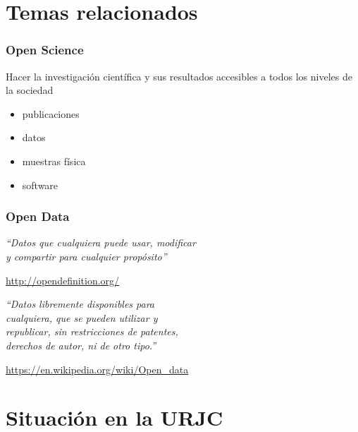 \documentclass[17pt,aspectratio=169]{beamer}
\begin{document}
\section{Temas relacionados}

\begin{frame}
\frametitle{Open Science}

Hacer la investigación científica y sus resultados accesibles a todos los niveles de la sociedad

\begin{itemize}
\item publicaciones
\item datos
\item muestras física
\item software
\end{itemize}

\end{frame}

\begin{frame}
\frametitle{Open Data}

{\em ``Datos que cualquiera puede usar, modificar \\
  y compartir para cualquier propósito'' \\
}
\begin{flushright}
  \url{http://opendefinition.org/}
\end{flushright}

{\em ``Datos libremente disponibles para \\
cualquiera, que se pueden utilizar y \\
republicar, sin restricciones de patentes, \\
derechos de autor, ni de otro tipo.'' \\
}

\begin{flushright}
  \url{https://en.wikipedia.org/wiki/Open_data}
\end{flushright}



\end{frame}

\section{Situación en la URJC}
\end{document}
